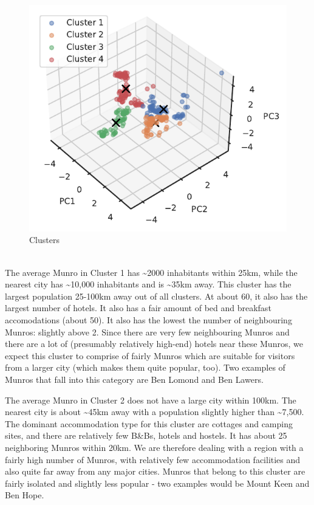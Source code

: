 \documentclass[11pt,a4paper]{article}
\begin{document}
\begin{figure} [h!]
  \centering
  \includegraphics{report/3d_clusters.pdf}
  \caption{Clusters}
  \label{fds-project-template:fig:3d_clusters}
\end{figure} \\
The average Munro in Cluster 1 has \textasciitilde 2000 inhabitants within 25km, while the nearest city has \textasciitilde 10,000 inhabitants and is \textasciitilde 35km away. This cluster has the largest population 25-100km away out of all clusters. At about 60, it also has the largest number of hotels. It also has a fair amount of bed and breakfast accomodations (about 50). It also has the lowest the number of neighbouring Munros: slightly above 2. Since there are very few neighbouring Munros and there are a lot of (presumably relatively high-end) hotels near these Munros, we expect this cluster to comprise of fairly  Munros which are suitable for visitors from a larger city (which makes them quite popular, too). Two examples of Munros that fall into this category are Ben Lomond and Ben Lawers.

The average Munro in Cluster 2 does not have a large city within 100km. The nearest city is about \textasciitilde 45km away with a population slightly higher than \textasciitilde 7,500. The dominant accommodation type for this cluster are cottages and camping sites, and there are relatively few B&Bs, hotels and hostels. It has about 25 neighboring Munros within 20km. We are therefore dealing with a region with a fairly high number of Munros, with relatively few accommodation facilities and also quite far away from any major cities. Munros that belong to this cluster are fairly isolated and slightly less popular - two examples would be Mount Keen and Ben Hope.
\end{document}
